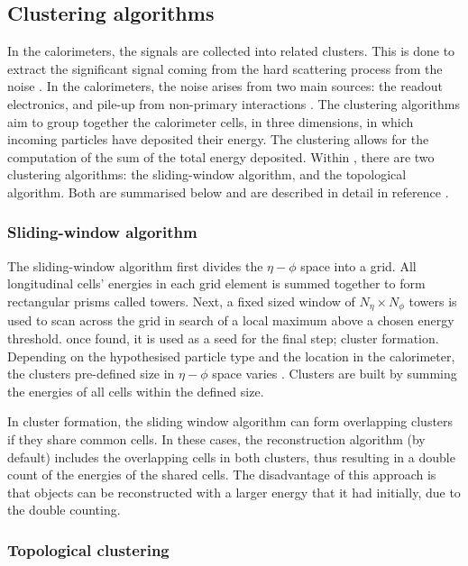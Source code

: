 \subsection{Clustering algorithms}
\label{ssec:clusteringalgorithms}
In the calorimeters, the signals are collected into related clusters. This is done to extract the significant signal coming from the hard scattering process from the noise \cite{Aad_2017_topo_clustering}. In the calorimeters, the noise arises from two main sources: the readout electronics, and pile-up from non-primary interactions \cite{Lampl:1099735}. The clustering algorithms aim to group together the calorimeter cells, in three dimensions, in which incoming particles have deposited their energy. The clustering allows for the computation of the sum of the total energy deposited. Within \ATLAS, there are two clustering algorithms: the sliding-window algorithm, and the topological algorithm. Both are summarised below and are described in detail in reference \cite{Lampl:1099735}. 

\subsubsection{Sliding-window algorithm}

The sliding-window algorithm first divides the $\eta-\phi$ space into a grid. All longitudinal cells' energies in each grid element is summed together to form rectangular prisms called towers. Next, a fixed sized window of $N_{\eta}\times N_{\phi}$ towers is used to scan across the grid in search of a local maximum above a chosen energy threshold. once found, it is used as a seed for the final step; cluster formation. Depending on the hypothesised particle type and the location in the calorimeter, the clusters pre-defined size in $\eta-\phi$ space varies \cite{Lampl:1099735}. Clusters are built by summing the energies of all cells within the defined size.

In cluster formation, the sliding window algorithm can form overlapping clusters if they share common cells. In these cases, the reconstruction algorithm (by default) includes the overlapping cells in both clusters, thus resulting in a double count of the energies of the shared cells. The disadvantage of this approach is that objects can be reconstructed with a larger energy that it had initially, due to the double counting. 

\subsubsection{Topological clustering}

